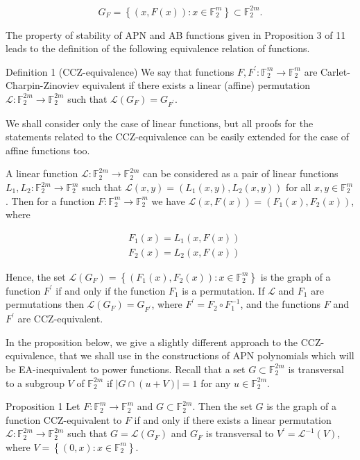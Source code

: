 \documentclass[10pt]{article}
\begin{document}
$$
G_{F}=\left\{(x, F(x)): x \in \mathbb{F}_{2}^{m}\right\} \subset \mathbb{F}_{2}^{2 m} .
$$

The property of stability of APN and AB functions given in Proposition 3 of 11 leads to the definition of the following equivalence relation of functions.

Definition 1 (CCZ-equivalence) We say that functions $F, F^{\prime}: \mathbb{F}_{2}^{m} \rightarrow \mathbb{F}_{2}^{m}$ are Carlet-Charpin-Zinoviev equivalent if there exists a linear (affine) permutation $\mathcal{L}: \mathbb{F}_{2}^{2 m} \rightarrow \mathbb{F}_{2}^{2 m}$ such that $\mathcal{L}\left(G_{F}\right)=G_{F^{\prime}}$.

We shall consider only the case of linear functions, but all proofs for the statements related to the CCZ-equivalence can be easily extended for the case of affine functions too.

A linear function $\mathcal{L}: \mathbb{F}_{2}^{2 m} \rightarrow \mathbb{F}_{2}^{2 m}$ can be considered as a pair of linear functions $L_{1}, L_{2}: \mathbb{F}_{2}^{2 m} \rightarrow \mathbb{F}_{2}^{m}$ such that $\mathcal{L}(x, y)=\left(L_{1}(x, y), L_{2}(x, y)\right)$ for all $x, y \in \mathbb{F}_{2}^{m}$. Then for a function $F: \mathbb{F}_{2}^{m} \rightarrow \mathbb{F}_{2}^{m}$ we have $\mathcal{L}(x, F(x))=\left(F_{1}(x), F_{2}(x)\right)$, where


\begin{align*}
& F_{1}(x)=L_{1}(x, F(x))  \tag{1}\\
& F_{2}(x)=L_{2}(x, F(x)) \tag{2}
\end{align*}


Hence, the set $\mathcal{L}\left(G_{F}\right)=\left\{\left(F_{1}(x), F_{2}(x)\right): x \in \mathbb{F}_{2}^{m}\right\}$ is the graph of a function $F^{\prime}$ if and only if the function $F_{1}$ is a permutation. If $\mathcal{L}$ and $F_{1}$ are permutations then $\mathcal{L}\left(G_{F}\right)=G_{F^{\prime}}$, where $F^{\prime}=F_{2} \circ F_{1}^{-1}$, and the functions $F$ and $F^{\prime}$ are CCZ-equivalent.

In the proposition below, we give a slightly different approach to the CCZ-equivalence, that we shall use in the constructions of APN polynomials which will be EA-inequivalent to power functions. Recall that a set $G \subset \mathbb{F}_{2}^{2 m}$ is transversal to a subgroup $V$ of $\mathbb{F}_{2}^{2 m}$ if $|G \cap(u+V)|=1$ for any $u \in \mathbb{F}_{2}^{2 m}$.

Proposition 1 Let $F: \mathbb{F}_{2}^{m} \rightarrow \mathbb{F}_{2}^{m}$ and $G \subset \mathbb{F}_{2}^{2 m}$. Then the set $G$ is the graph of a function CCZ-equivalent to $F$ if and only if there exists a linear permutation $\mathcal{L}: \mathbb{F}_{2}^{2 m} \rightarrow \mathbb{F}_{2}^{2 m}$ such that $G=\mathcal{L}\left(G_{F}\right)$ and $G_{F}$ is transversal to $V^{\prime}=\mathcal{L}^{-1}(V)$, where $V=\left\{(0, x): x \in \mathbb{F}_{2}^{m}\right\}$.
\end{document}
